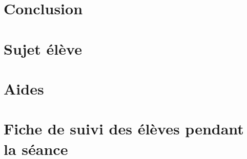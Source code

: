 \documentclass[12pt,a4paper]{article}
\begin{document}
\section*{Conclusion}

\newpage
\appendix



\newpage
\appendix



\section{Sujet élève}
\label{ann:sujet}



\section{Aides}
\label{ann:aides}



\section{Fiche de suivi des élèves pendant la séance}


\end{document}
